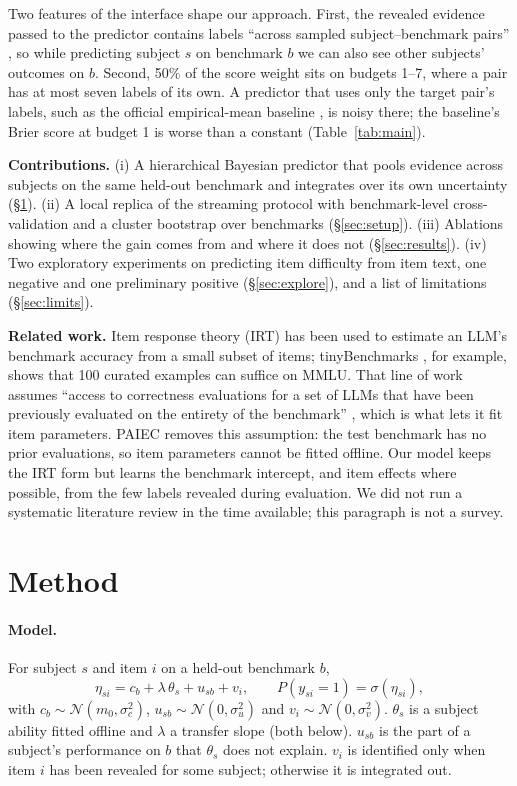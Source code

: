 \documentclass{article}
\begin{document}
Two features of the interface shape our approach. First, the revealed evidence passed to the predictor contains labels ``across sampled subject--benchmark pairs'' \citep{paiec2026}, so while predicting subject $s$ on benchmark $b$ we can also see other subjects' outcomes on $b$. Second, 50\% of the score weight sits on budgets 1--7, where a pair has at most seven labels of its own. A predictor that uses only the target pair's labels, such as the official empirical-mean baseline \citep{paiec_baselines_2026}, is noisy there; the baseline's Brier score at budget 1 is worse than a constant (Table~\ref{tab:main}).

\textbf{Contributions.} (i) A hierarchical Bayesian predictor that pools evidence across subjects on the same held-out benchmark and integrates over its own uncertainty (\S\ref{sec:method}). (ii) A local replica of the streaming protocol with benchmark-level cross-validation and a cluster bootstrap over benchmarks (\S\ref{sec:setup}). (iii) Ablations showing where the gain comes from and where it does not (\S\ref{sec:results}). (iv) Two exploratory experiments on predicting item difficulty from item text, one negative and one preliminary positive (\S\ref{sec:explore}), and a list of limitations (\S\ref{sec:limits}).

\textbf{Related work.} Item response theory (IRT) has been used to estimate an LLM's benchmark accuracy from a small subset of items; tinyBenchmarks \citep{polo2024tinybenchmarks}, for example, shows that 100 curated examples can suffice on MMLU. That line of work assumes ``access to correctness evaluations for a set of LLMs that have been previously evaluated on the entirety of the benchmark'' \citep{polo2024tinybenchmarks}, which is what lets it fit item parameters. PAIEC removes this assumption: the test benchmark has no prior evaluations, so item parameters cannot be fitted offline. Our model keeps the IRT form but learns the benchmark intercept, and item effects where possible, from the few labels revealed during evaluation. We did not run a systematic literature review in the time available; this paragraph is not a survey.

\section{Method}
\label{sec:method}

\paragraph{Model.} For subject $s$ and item $i$ on a held-out benchmark $b$,
\begin{equation}
  \eta_{si} = c_b + \lambda\,\theta_s + u_{sb} + v_i, \qquad P(y_{si}=1) = \sigma(\eta_{si}),
  \label{eq:model}
\end{equation}
with $c_b \sim \mathcal{N}(m_0, \sigma_c^2)$, $u_{sb} \sim \mathcal{N}(0, \sigma_u^2)$ and $v_i \sim \mathcal{N}(0, \sigma_v^2)$. $\theta_s$ is a subject ability fitted offline and $\lambda$ a transfer slope (both below). $u_{sb}$ is the part of a subject's performance on $b$ that $\theta_s$ does not explain. $v_i$ is identified only when item $i$ has been revealed for some subject; otherwise it is integrated out.
\end{document}
